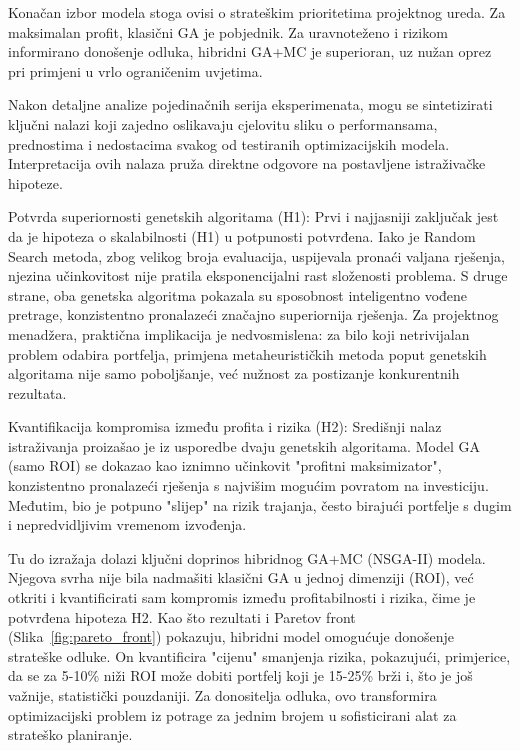 Konačan izbor modela stoga ovisi o strateškim prioritetima projektnog ureda. Za maksimalan profit, klasični GA je pobjednik. Za uravnoteženo i rizikom informirano donošenje odluka, hibridni GA+MC je superioran, uz nužan oprez pri primjeni u vrlo ograničenim uvjetima.


Nakon detaljne analize pojedinačnih serija eksperimenata, mogu se sintetizirati ključni nalazi koji zajedno oslikavaju cjelovitu sliku o performansama, prednostima i nedostacima svakog od testiranih optimizacijskih modela. Interpretacija ovih nalaza pruža direktne odgovore na postavljene istraživačke hipoteze.

Potvrda superiornosti genetskih algoritama (H1):
Prvi i najjasniji zaključak jest da je hipoteza o skalabilnosti (H1) u potpunosti potvrđena. Iako je Random Search metoda, zbog velikog broja evaluacija, uspijevala pronaći valjana rješenja, njezina učinkovitost nije pratila eksponencijalni rast složenosti problema. S druge strane, oba genetska algoritma pokazala su sposobnost inteligentno vođene pretrage, konzistentno pronalazeći značajno superiornija rješenja. Za projektnog menadžera, praktična implikacija je nedvosmislena: za bilo koji netrivijalan problem odabira portfelja, primjena metaheurističkih metoda poput genetskih algoritama nije samo poboljšanje, već nužnost za postizanje konkurentnih rezultata.

Kvantifikacija kompromisa između profita i rizika (H2):
Središnji nalaz istraživanja proizašao je iz usporedbe dvaju genetskih algoritama. Model GA (samo ROI) se dokazao kao iznimno učinkovit "profitni maksimizator", konzistentno pronalazeći rješenja s najvišim mogućim povratom na investiciju. Međutim, bio je potpuno "slijep" na rizik trajanja, često birajući portfelje s dugim i nepredvidljivim vremenom izvođenja.

Tu do izražaja dolazi ključni doprinos hibridnog GA+MC (NSGA-II) modela. Njegova svrha nije bila nadmašiti klasični GA u jednoj dimenziji (ROI), već otkriti i kvantificirati sam kompromis između profitabilnosti i rizika, čime je potvrđena hipoteza H2. Kao što rezultati i Paretov front (Slika~\ref{fig:pareto_front}) pokazuju, hibridni model omogućuje donošenje strateške odluke. On kvantificira "cijenu" smanjenja rizika, pokazujući, primjerice, da se za 5-10\% niži ROI može dobiti portfelj koji je 15-25\% brži i, što je još važnije, statistički pouzdaniji. Za donositelja odluka, ovo transformira optimizacijski problem iz potrage za jednim brojem u sofisticirani alat za strateško planiranje.

